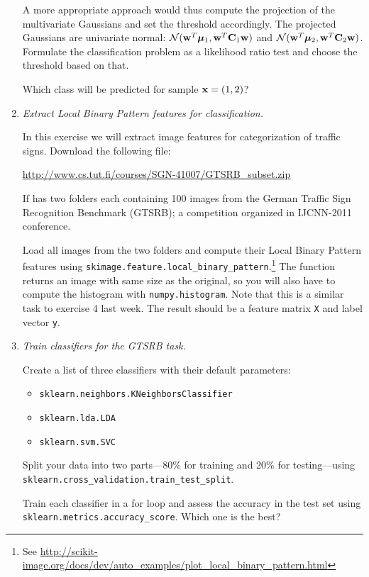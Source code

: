 \documentclass[a4paper,12pt]{scrartcl}
\newcommand{\x}{{\bf x}}
\newcommand{\w}{{\bf w}}
\newcommand{\C}{{\bf C}}
\newcommand{\mub}{{\boldsymbol{\mu}}}
\newcommand{\python}{{\fbox{\texttt{\bfseries python}}\quad}}
\begin{document}
\begin{enumerate}
A more appropriate approach would thus compute the projection of
the multivariate Gaussians and set the threshold accordingly.
The projected Gaussians are univariate normal: ${\cal N}(\w^T\mub_1, \w^T\C_1\w)$
and ${\cal N}(\w^T\mub_2, \w^T\C_2\w)$. Formulate the classification 
problem as a likelihood ratio test and choose the threshold based on that.

Which class will be predicted for sample $\x = (1,2)$?

\item \python \emph{Extract Local Binary Pattern features for classification.}

In this exercise we will extract image features for categorization of traffic signs.
Download the following file:


\url{http://www.cs.tut.fi/courses/SGN-41007/GTSRB_subset.zip}

If has two folders each containing 100 images from the German Traffic Sign
Recognition Benchmark (GTSRB); a competition organized in IJCNN-2011 conference.

Load all images from the two folders and compute their Local Binary Pattern
features using \verb+skimage.feature.local_binary_pattern+.\footnote{See
\url{http://scikit-image.org/docs/dev/auto_examples/plot_local_binary_pattern.html}}
The function returns an image with same size as the original, so you will
also have to compute the histogram with \verb+numpy.histogram+.
Note that this is a similar task to exercise 4 last week.
The result should be a feature matrix \verb+X+ and label vector \verb+y+.

\item \python \emph{Train classifiers for the GTSRB task.}

Create a list of three classifiers with their default parameters:
\begin{itemize}
	\item \verb+sklearn.neighbors.KNeighborsClassifier+
	\item \verb+sklearn.lda.LDA+
	\item \verb+sklearn.svm.SVC+
\end{itemize}

Split your data into two parts---80\% for training and 20\% for testing---using
\verb+sklearn.cross_validation.train_test_split+. 

Train each classifier in a for loop and assess the accuracy in the test set
using \verb+sklearn.metrics.accuracy_score+.
Which one is the best?
\end{enumerate}
\end{document}
